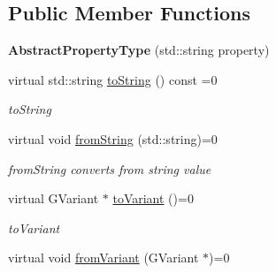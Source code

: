 \subsection*{Public Member Functions}
\begin{DoxyCompactItemize}
\item 
\hypertarget{classAbstractPropertyType_a2a525d57a943122e1cc709f738deb13e}{{\bfseries Abstract\-Property\-Type} (std\-::string property)}\label{classAbstractPropertyType_a2a525d57a943122e1cc709f738deb13e}

\item 
virtual std\-::string \hyperlink{classAbstractPropertyType_a4c359b2e7c3b0ede21c64ba2c90567aa}{to\-String} () const =0
\begin{DoxyCompactList}\small\item\em to\-String \end{DoxyCompactList}\item 
\hypertarget{classAbstractPropertyType_a9fae6e2ced72541b5e2bf321a1d193b0}{virtual void \hyperlink{classAbstractPropertyType_a9fae6e2ced72541b5e2bf321a1d193b0}{from\-String} (std\-::string)=0}\label{classAbstractPropertyType_a9fae6e2ced72541b5e2bf321a1d193b0}

\begin{DoxyCompactList}\small\item\em from\-String converts from string value \end{DoxyCompactList}\item 
virtual G\-Variant $\ast$ \hyperlink{classAbstractPropertyType_ae4c8025e310eb06916a28e0341f3356d}{to\-Variant} ()=0
\begin{DoxyCompactList}\small\item\em to\-Variant \end{DoxyCompactList}\item 
\hypertarget{classAbstractPropertyType_a3de5f842aa061f168438e67ca29c2685}{virtual void \hyperlink{classAbstractPropertyType_a3de5f842aa061f168438e67ca29c2685}{from\-Variant} (G\-Variant $\ast$)=0}\label{classAbstractPropertyType_a3de5f842aa061f168438e67ca29c2685}


\end{DoxyCompactItemize}
